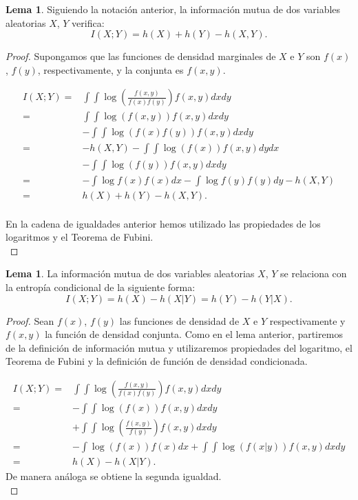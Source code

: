 \documentclass[12pt,a4paper]{report} %
\theoremstyle{definition}
\newtheorem{lemma}[theorem]{Lema}
\begin{document}
\begin{lemma}\label{l:ent_im}
  Siguiendo la notación anterior, la información mutua de dos variables aleatorias $X$, $Y$ verifica:\[
  I(X;Y) = h(X) + h(Y) - h(X,Y).
  \]
\end{lemma}

\begin{proof}
  Supongamos que las funciones de densidad marginales de $X$ e $Y$ son $f(x)$, $f(y)$, respectivamente, y la conjunta es $f(x,y)$.

  \begin{align*}
    I(X;Y) =& \int \int  \log \left(\frac{f(x,y)}{f(x)f(y)}\right)f(x,y)dxdy \\[3pt]
    =& \int \int  \log \left(f(x,y)\right)f(x,y)dxdy\\
    &- \int \int  \log \left(f(x)f(y)\right) f(x,y)dxdy\\[3pt]
    =& -h(X,Y)-\int\int \log \left(f(x)\right)f(x,y)  dy dx\\
    &- \int \int \log \left(f(y)\right)f(x,y)dxdy\\[3pt]
    =& -\int  \log f(x)f(x)dx - \int \log f(y) f(y)dy -h(X,Y)\\[3pt]
    =& h(X) + h(Y) - h(X,Y).\\[-10pt]
  \end{align*}

En la cadena de igualdades anterior hemos utilizado las propiedades de los logaritmos y el Teorema de Fubini.\\
\end{proof}

\begin{lemma}
  La información mutua de dos variables aleatorias $X$, $Y$ se relaciona con la entropía condicional de la siguiente forma:\[
I(X;Y) = h(X) - h(X|Y) = h(Y) - h(Y|X).
  \]
\end{lemma}

\begin{proof}
  Sean $f(x)$, $f(y)$ las funciones de densidad de $X$ e $Y$ respectivamente y $f(x,y)$ la función de densidad conjunta.
  Como en el lema anterior, partiremos de la definición de información mutua y utilizaremos propiedades del logaritmo, el Teorema de Fubini y la definición de función de densidad condicionada.
  
  \begin{align*}
    I(X;Y)=& \int \int  \log\left( \frac{f(x,y)}{f(x)f(y)}\right)f(x,y)dxdy \\[3pt]
    =& - \int\int \log \left(f(x)\right)f(x,y)  dx dy\\ &+ \int\int\log \left(\frac{f(x,y)}{f(y)}\right)  f(x,y)dx dy\\[3pt]
    =& - \int  \log \left(f(x)\right)f(x) dx + \int\int \log \left(f(x|y)\right)f(x,y) dx dy\\  
    =& h(X) - h(X|Y).
  \end{align*}
De manera análoga se obtiene la segunda igualdad.\\
\end{proof}
\end{document}
